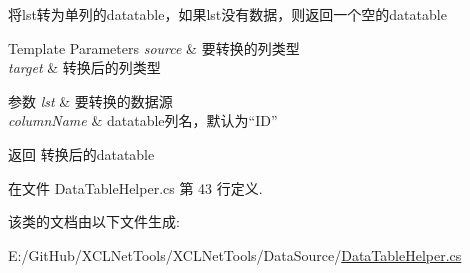 将lst转为单列的datatable，如果lst没有数据，则返回一个空的datatable 


\begin{DoxyTemplParams}{Template Parameters}
{\em source} & 要转换的列类型\\
\hline
{\em target} & 转换后的列类型\\
\hline
\end{DoxyTemplParams}

\begin{DoxyParams}{参数}
{\em lst} & 要转换的数据源\\
\hline
{\em column\+Name} & datatable列名，默认为“\+I\+D”\\
\hline
\end{DoxyParams}
\begin{DoxyReturn}{返回}
转换后的datatable
\end{DoxyReturn}


在文件 Data\+Table\+Helper.\+cs 第 43 行定义.



该类的文档由以下文件生成\+:\begin{DoxyCompactItemize}
\item 
E\+:/\+Git\+Hub/\+X\+C\+L\+Net\+Tools/\+X\+C\+L\+Net\+Tools/\+Data\+Source/\hyperlink{_data_table_helper_8cs}{Data\+Table\+Helper.\+cs}\end{DoxyCompactItemize}
